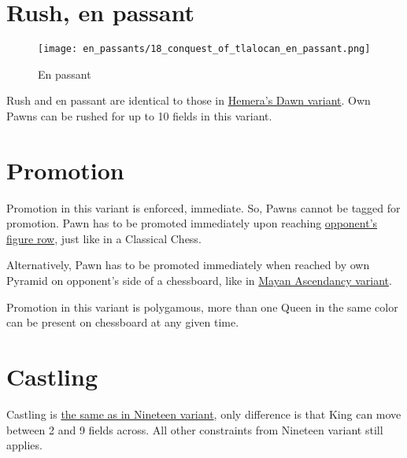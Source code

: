 \section*{Rush, en passant}
\label{sec:Conquest of Tlalocan/Rush, en passant}

\vspace*{-1.2\baselineskip}
\noindent
\begin{figure}[!h]
\texttt{[image: en\_passants/18\_conquest\_of\_tlalocan\_en\_passant.png]}
\caption{En passant}
\label{fig:18_conquest_of_tlalocan_en_passant}
\end{figure}

Rush and en passant are identical to those in
\hyperref[fig:14_hemera_s_dawn_en_passant]{Hemera's Dawn variant}.
Own Pawns can be rushed for up to 10 fields in this variant.

\clearpage %

\section*{Promotion}
\label{sec:Conquest of Tlalocan/Promotion}

Promotion in this variant is enforced, immediate. So, Pawns cannot be tagged
for promotion. Pawn has to be promoted immediately upon reaching
\hyperref[sec:Terms/Figure row]{opponent's figure row},
just like in a Classical Chess.

Alternatively, Pawn has to be promoted immediately when reached by own Pyramid
on opponent's side of a chessboard, like in
\hyperref[sec:Mayan Ascendancy/Pyramid/Promotion]{Mayan Ascendancy variant}.

Promotion in this variant is polygamous, more than one Queen in the same color
can be present on chessboard at any given time.

\clearpage %

\section*{Castling}
\label{sec:Conquest of Tlalocan/Castling}

Castling is
\hyperref[sec:Nineteen/Castling]{the same as in Nineteen variant},
only difference is that King can move
between 2 and 9 fields across. All other constraints from Nineteen variant still
applies.

